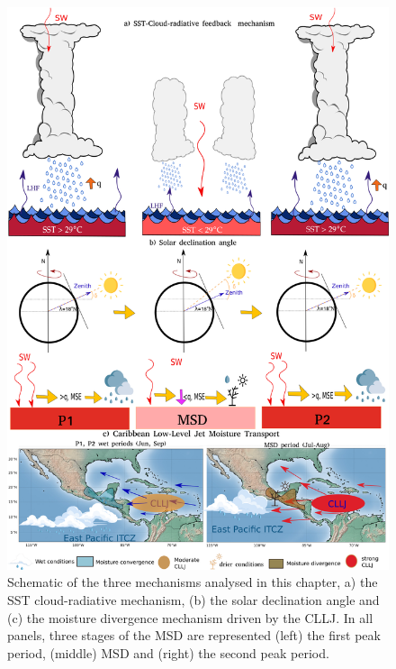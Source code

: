  \begin{figure}[t!]
 \centering
\includegraphics[height=0.85\textheight]{figures/msd_all_schematics.png}
\caption[Schematics of MSD mechanisms.]{Schematic of the three mechanisms analysed in this chapter, a) the SST cloud-radiative mechanism, (b) the solar declination angle and (c) the moisture divergence mechanism driven by the CLLJ. In all panels, three stages of the MSD are represented (left) the first peak period, (middle) MSD and (right) the second peak period.}
\label{fig:schematic_msd}
\end{figure} 
 

